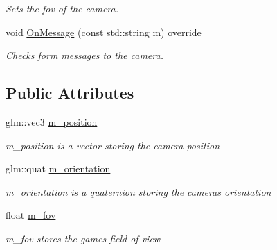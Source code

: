 \begin{DoxyCompactItemize}
\begin{DoxyCompactList}\small\item\em Sets the fov of the camera. \end{DoxyCompactList}\item 
\mbox{\label{class_camera_a2aee4db547c6bcafa219f9c59e2775fa}} 
void \mbox{\hyperlink{class_camera_a2aee4db547c6bcafa219f9c59e2775fa}{On\+Message}} (const std\+::string m) override
\begin{DoxyCompactList}\small\item\em Checks form messages to the camera. \end{DoxyCompactList}\end{DoxyCompactItemize}
\subsection*{Public Attributes}
\begin{DoxyCompactItemize}
\item 
\mbox{\label{class_camera_aa4d06d49524248f81823444fa2544da0}} 
glm\+::vec3 \mbox{\hyperlink{class_camera_aa4d06d49524248f81823444fa2544da0}{m\+\_\+position}}
\begin{DoxyCompactList}\small\item\em m\+\_\+position is a vector storing the camera position \end{DoxyCompactList}\item 
\mbox{\label{class_camera_ac035d6cb4b4bae255d6d12f51137357e}} 
glm\+::quat \mbox{\hyperlink{class_camera_ac035d6cb4b4bae255d6d12f51137357e}{m\+\_\+orientation}}
\begin{DoxyCompactList}\small\item\em m\+\_\+orientation is a quaternion storing the cameras orientation \end{DoxyCompactList}\item 
\mbox{\label{class_camera_aa404a4e057fa16fb82ce8668d7a661b6}} 
float \mbox{\hyperlink{class_camera_aa404a4e057fa16fb82ce8668d7a661b6}{m\+\_\+fov}}
\begin{DoxyCompactList}\small\item\em m\+\_\+fov stores the games field of view \end{DoxyCompactList}\end{DoxyCompactItemize}


